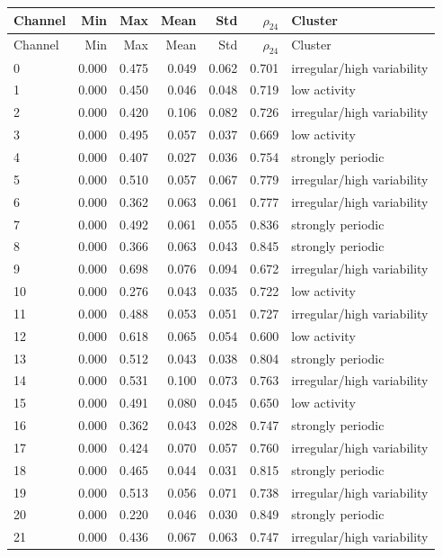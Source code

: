 \begin{longtable}{lrrrrrl}
\toprule
Channel & Min & Max & Mean & Std & $\rho_{24}$ & Cluster \\
\midrule
\endfirsthead
\toprule
Channel & Min & Max & Mean & Std & $\rho_{24}$ & Cluster \\
\midrule
\endhead
0 & 0.000 & 0.475 & 0.049 & 0.062 & 0.701 & irregular/high variability \\
1 & 0.000 & 0.450 & 0.046 & 0.048 & 0.719 & low activity \\
2 & 0.000 & 0.420 & 0.106 & 0.082 & 0.726 & irregular/high variability \\
3 & 0.000 & 0.495 & 0.057 & 0.037 & 0.669 & low activity \\
4 & 0.000 & 0.407 & 0.027 & 0.036 & 0.754 & strongly periodic \\
5 & 0.000 & 0.510 & 0.057 & 0.067 & 0.779 & irregular/high variability \\
6 & 0.000 & 0.362 & 0.063 & 0.061 & 0.777 & irregular/high variability \\
7 & 0.000 & 0.492 & 0.061 & 0.055 & 0.836 & strongly periodic \\
8 & 0.000 & 0.366 & 0.063 & 0.043 & 0.845 & strongly periodic \\
9 & 0.000 & 0.698 & 0.076 & 0.094 & 0.672 & irregular/high variability \\
10 & 0.000 & 0.276 & 0.043 & 0.035 & 0.722 & low activity \\
11 & 0.000 & 0.488 & 0.053 & 0.051 & 0.727 & irregular/high variability \\
12 & 0.000 & 0.618 & 0.065 & 0.054 & 0.600 & low activity \\
13 & 0.000 & 0.512 & 0.043 & 0.038 & 0.804 & strongly periodic \\
14 & 0.000 & 0.531 & 0.100 & 0.073 & 0.763 & irregular/high variability \\
15 & 0.000 & 0.491 & 0.080 & 0.045 & 0.650 & low activity \\
16 & 0.000 & 0.362 & 0.043 & 0.028 & 0.747 & strongly periodic \\
17 & 0.000 & 0.424 & 0.070 & 0.057 & 0.760 & irregular/high variability \\
18 & 0.000 & 0.465 & 0.044 & 0.031 & 0.815 & strongly periodic \\
19 & 0.000 & 0.513 & 0.056 & 0.071 & 0.738 & irregular/high variability \\
20 & 0.000 & 0.220 & 0.046 & 0.030 & 0.849 & strongly periodic \\
21 & 0.000 & 0.436 & 0.067 & 0.063 & 0.747 & irregular/high variability \\

\end{longtable}

